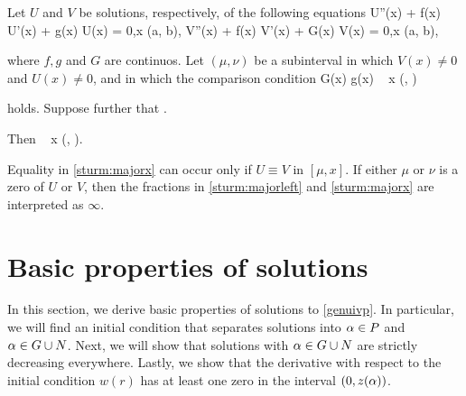 \begin{theorem}
    Let $U$ and $V$ be solutions, respectively, of the following equations
    \be \label{sturm:uivp}
        U''(x) + f(x) U'(x) + g(x) U(x) = 0,\quad x \in (a, b),
    \ee
    \be \label{sturm:vivp}
        V''(x) + f(x) V'(x) + G(x) V(x) = 0,\quad x \in (a, b),
    \ee
    
    where $f, g$ and $G$ are continuos. Let $(\mu, \nu)$ be a subinterval in
    which $V(x) \neq 0$ and $U(x) \neq 0$, and in which the comparison condition 
    \be \label{sturm:compare}
        G(x) \geq g(x) \quad {} ~ x \in (\mu, \nu)
    \ee
    
    holds. Suppose further that
    \be \label{sturm:majorleft}
         \leq {}.
    \ee

    Then
    \be \label{sturm:majorx}
         \leq {}\quad {} ~ x \in
        (\mu, \nu).
    \ee

    Equality in \eqref{sturm:majorx} can occur only if $U \equiv V$ in $[\mu,
    x]$. If either $\mu$ or $\nu$ is a zero of $U$ or $V$, then the fractions in
    \eqref{sturm:majorleft} and \eqref{sturm:majorx} are interpreted as
    $\infty$. 

\end{theorem}

\begin{comment}
{\red In the end, we wish to show that the function $\za$ is monotone decreasing in
$\a$. Or actually, that $(\a, \a+\e)\subset N$ and if $\bar{\a}\in N$ then $\za :
[\bar{\a}, \infty)\to(0,\infty)$ is monotone decreasing.}
\end{comment}


\section{Basic properties of solutions}
In this section, we derive basic properties of solutions to
\eqref{genuivp}. In particular, we will find an initial condition that
separates solutions into $\alpha \in P$ and $\alpha \in G \cup N$. Next, we will show
that solutions with $\alpha \in G \cup N$ are strictly decreasing everywhere.
Lastly, we show that the derivative with respect to the initial condition
$w(r)$ has at least one zero in the interval $(0, z(\alpha))$. 

